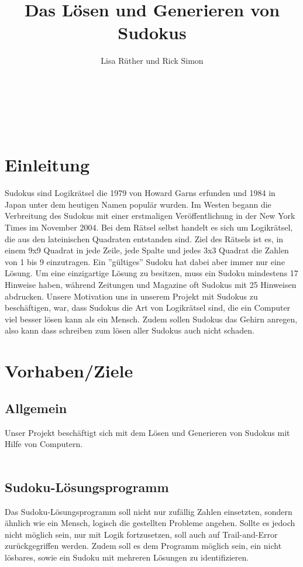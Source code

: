\documentclass[11pt,a4paper]{article}
\author{Lisa Rüther und Rick Simon}
\title{Das Lösen und Generieren von Sudokus}
\begin{document}
\maketitle
\newpage
\tableofcontents
\ \\
\listoffigures
\ \\
\listoftables

\newpage
\section{Einleitung}
Sudokus sind Logikrätsel die 1979 von Howard Garns erfunden und 1984 in Japan unter dem heutigen Namen populär wurden. Im Westen begann die Verbreitung des Sudokus mit einer erstmaligen Veröffentlichung in der New York Times im November 2004. Bei dem Rätsel selbst handelt es sich um Logikrätsel, die aus den lateinischen Quadraten entstanden sind. Ziel des Rätsels ist es, in einem 9x9 Quadrat in jede Zeile, jede Spalte und jedes 3x3 Quadrat die Zahlen von 1 bis 9 einzutragen. Ein ''gültiges'' Sudoku hat dabei aber immer nur eine Lösung. Um eine einzigartige Lösung zu besitzen, muss ein Sudoku mindestens 17 Hinweise haben, während Zeitungen und Magazine oft Sudokus mit 25 Hinweisen abdrucken.
Unsere Motivation uns in unserem Projekt mit Sudokus zu beschäftigen, war, dass Sudokus die Art von Logikrätsel sind, die ein Computer viel besser lösen kann als ein Mensch. Zudem sollen Sudokus das Gehirn anregen, also kann dass schreiben zum lösen aller Sudokus auch nicht schaden.        

\section{Vorhaben/Ziele}
\subsection{Allgemein}
Unser Projekt beschäftigt sich mit dem Lösen und Generieren von Sudokus mit Hilfe von Computern.   \\
\ \\
\subsection{Sudoku-Lösungsprogramm}
Das Sudoku-Lösungsprogramm soll nicht nur zufällig Zahlen einsetzten, sondern ähnlich wie ein Mensch, logisch die gestellten Probleme angehen. Sollte es jedoch nicht möglich sein, nur mit Logik fortzusetzen, soll auch auf Trail-and-Error zurückgegriffen werden. Zudem soll es dem Programm möglich sein, ein nicht lösbares, sowie ein Sudoku mit mehreren Lösungen zu identifizieren. \ \\
\ \\
\end{document}

